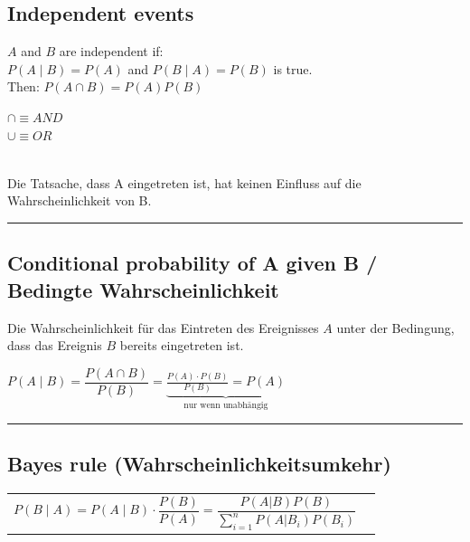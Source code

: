 	\subsection{Independent events }
		\begin{minipage}{12cm}
			$A$ and $B$ are independent if:\\
			
			$P(A \mid B)=P(A)$ and $P(B \mid A)=P(B)$ is true.\\
			
			Then: \hspace*{8mm} $P(A\cap B)=P(A)P(B)$\\
		\end{minipage}
		\begin{minipage}{4cm}
			$ \cap \equiv AND $ \\
			$ \cup \equiv OR $\newline
		\end {minipage}\\
    	Die Tatsache, dass A eingetreten ist, hat keinen Einfluss auf die 
		Wahrscheinlichkeit von B.\\ 

		\vspace{2mm}
		\hrule
		\vspace{3mm}
		
	\subsection{Conditional probability of A given B / Bedingte Wahrscheinlichkeit }
		Die Wahrscheinlichkeit für das Eintreten des Ereignisses $A$ unter der
		Bedingung, dass das Ereignis $B$ bereits eingetreten ist.
		\begin{center}
		$P(A\mid B)= \dfrac{P(A\cap B)}{P(B)}=\underbrace{\frac{P(A)\cdot
		P(B)}{P(B)}=P(A)}_{\text{nur wenn unabhängig}}$ 
		\end{center}

	\vspace{2mm}
	\hrule
	\vspace{3mm}

\subsection{Bayes rule (Wahrscheinlichkeitsumkehr) }
		\begin{tabular}{ll}
		  $P(B\mid A)=P(A\mid B) \cdot\dfrac{P(B)}{P(A)} = \dfrac{P(A|B) P(B)}{\sum\limits_{i=1}^n P(A|B_i) P(B_i)}$\vspace{1mm}
		\end{tabular}
		
